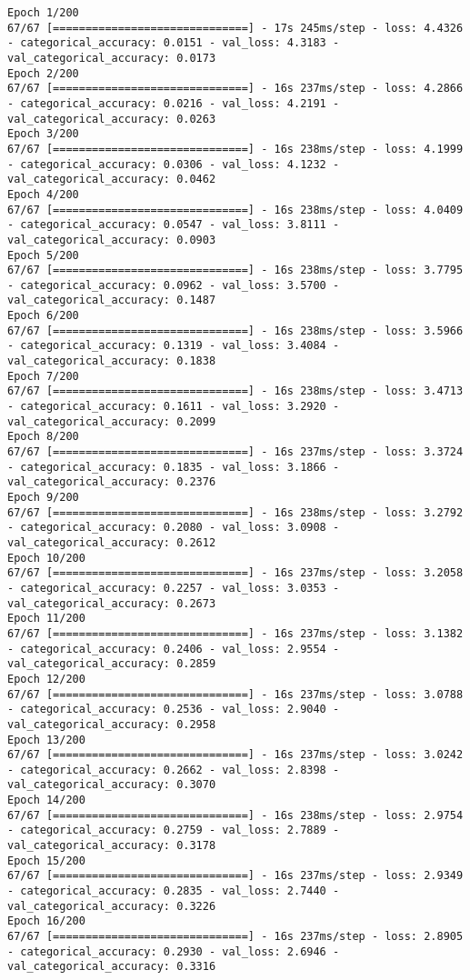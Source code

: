 \begin{lstlisting}
Epoch 1/200
67/67 [==============================] - 17s 245ms/step - loss: 4.4326 - categorical_accuracy: 0.0151 - val_loss: 4.3183 - val_categorical_accuracy: 0.0173
Epoch 2/200
67/67 [==============================] - 16s 237ms/step - loss: 4.2866 - categorical_accuracy: 0.0216 - val_loss: 4.2191 - val_categorical_accuracy: 0.0263
Epoch 3/200
67/67 [==============================] - 16s 238ms/step - loss: 4.1999 - categorical_accuracy: 0.0306 - val_loss: 4.1232 - val_categorical_accuracy: 0.0462
Epoch 4/200
67/67 [==============================] - 16s 238ms/step - loss: 4.0409 - categorical_accuracy: 0.0547 - val_loss: 3.8111 - val_categorical_accuracy: 0.0903
Epoch 5/200
67/67 [==============================] - 16s 238ms/step - loss: 3.7795 - categorical_accuracy: 0.0962 - val_loss: 3.5700 - val_categorical_accuracy: 0.1487
Epoch 6/200
67/67 [==============================] - 16s 238ms/step - loss: 3.5966 - categorical_accuracy: 0.1319 - val_loss: 3.4084 - val_categorical_accuracy: 0.1838
Epoch 7/200
67/67 [==============================] - 16s 238ms/step - loss: 3.4713 - categorical_accuracy: 0.1611 - val_loss: 3.2920 - val_categorical_accuracy: 0.2099
Epoch 8/200
67/67 [==============================] - 16s 237ms/step - loss: 3.3724 - categorical_accuracy: 0.1835 - val_loss: 3.1866 - val_categorical_accuracy: 0.2376
Epoch 9/200
67/67 [==============================] - 16s 238ms/step - loss: 3.2792 - categorical_accuracy: 0.2080 - val_loss: 3.0908 - val_categorical_accuracy: 0.2612
Epoch 10/200
67/67 [==============================] - 16s 237ms/step - loss: 3.2058 - categorical_accuracy: 0.2257 - val_loss: 3.0353 - val_categorical_accuracy: 0.2673
Epoch 11/200
67/67 [==============================] - 16s 237ms/step - loss: 3.1382 - categorical_accuracy: 0.2406 - val_loss: 2.9554 - val_categorical_accuracy: 0.2859
Epoch 12/200
67/67 [==============================] - 16s 237ms/step - loss: 3.0788 - categorical_accuracy: 0.2536 - val_loss: 2.9040 - val_categorical_accuracy: 0.2958
Epoch 13/200
67/67 [==============================] - 16s 237ms/step - loss: 3.0242 - categorical_accuracy: 0.2662 - val_loss: 2.8398 - val_categorical_accuracy: 0.3070
Epoch 14/200
67/67 [==============================] - 16s 238ms/step - loss: 2.9754 - categorical_accuracy: 0.2759 - val_loss: 2.7889 - val_categorical_accuracy: 0.3178
Epoch 15/200
67/67 [==============================] - 16s 237ms/step - loss: 2.9349 - categorical_accuracy: 0.2835 - val_loss: 2.7440 - val_categorical_accuracy: 0.3226
Epoch 16/200
67/67 [==============================] - 16s 237ms/step - loss: 2.8905 - categorical_accuracy: 0.2930 - val_loss: 2.6946 - val_categorical_accuracy: 0.3316

\end{lstlisting}
